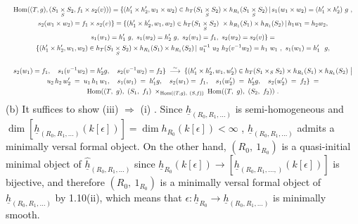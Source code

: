 \begin{equation*}
\resizebox{\textwidth}{!}{$\begin{gathered}
\mathrm{Hom}((T,g),(S_1\underset{S}{\times}S_2,f_1\times s_2(v)))=\{(h_1'\times h_2',w_1\times w_2)\in h_T(S_1\underset{S}{\times}S_2)\times h_{R_1}(S_1\underset{S}{\times}S_2)\,|\,s_1(w_1\times w_2)=(h_1'\times h_2')\ g\ ,\\
s_2(w_1\times w_2)=f_1\times s_2(v)\} = \{(h_1'\times h_2',w_1,w_2) \in h_T(S_1\underset{S}{\times}S_2)\ \times h_{R_1}(S_1)\times h_{R_1}(S_2)\,|\,h_1w_1 = h_2w_2,\\
s_1(w_1) = h_1'\ g,\ s_1(w_2) = h_2'\ g,\ s_2(w_1) = f_1,\ s_2(w_2) = s_2(v)\} =\\
\{(h_1'\times h_2',w_1,w_2) \in h_T(S_1\underset{S}{\times}S_2)\times h_{R_1}(S_1)\times h_{R_1}(S_2)\,|\ u_1^{-1}\ u_2\ h_2(v^{-1}w_2)=h_1\ w_1\ ,\ s_1(w_1) = h_1'\ \ g, 
\end{gathered}$}
\end{equation*}


\begin{equation*}
\resizebox{\textwidth}{!}{$\begin{gathered}
s_2(w_1)=f_1, \quad s_1(v^{-1}w_2)=h_2'g, \quad s_2(v^{-1}w_2)=f_2\} \;\overset{\sim}{\longrightarrow}\; \{(h_1'\times h_2', w_1, w_2') \in h_T(S_1\times_S S_2)\times h_{R_1}(S_1)\times h_{R_1}(S_2)\;\big| \\
u_2\, h_2\, w_2' \;=\; u_1\, h_1\, w_1, \quad s_1(w_1) \;=\; h_1'g, \quad s_2(w_1)=\; f_1, \quad s_1(w_2') \;=\; h_2'g, \quad s_2(w_2') \;=\; f_2\} \;= \\
\mathrm{Hom}((T,\ g),\ (S_1,\ f_1) \;\times_{\mathrm{Hom}((T,g),\ (S,f))}\; \mathrm{Hom}((T,\ g),\ (S_2,\ f_2))\ .
\end{gathered}$}
\end{equation*}
(b)  It suffices to show (iii) $\Rightarrow$ (i) . Since $\underline{h}_{(R_0,R_1,\ldots)}$ is semi-homogeneous and $\dim[\underline{h}_{(R_0,R_1,\ldots)}(k[\epsilon])] = \dim h_{R_0}(k[\epsilon]) < \infty$ , $\underline{h}_{(R_0,R_1,\ldots)}$ admits a minimally versal formal object. On the other hand, $(R_0,\ 1_{R_0})$ is a quasi-initial minimal object of $\widehat{\underline{h}}_{(R_0,R_1,\ldots)}$ since $\underline{h}_{R_0}(k[\epsilon]) \to [\underline{h}_{(R_0,R_1,\ldots,)}(k[\epsilon])]$ is bijective, and therefore $(R_0,\ 1_{R_0})$ is a minimally versal formal object of $\underline{h}_{(R_0,R_1,\ldots)}$ by 1.10(ii), which means that $\epsilon : \underline{h}_{R_0} \longrightarrow \underline{h}_{(R_0,R_1,\ldots)}$ is minimally smooth.

